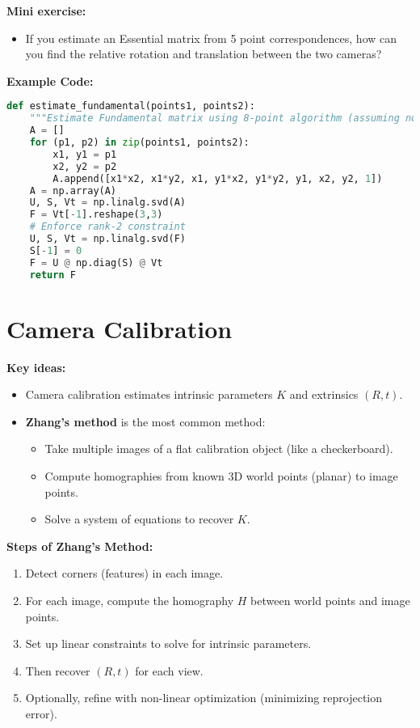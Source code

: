 \documentclass[a4paper,11pt]{article}
\begin{document}
\textbf{Mini exercise:}
\begin{itemize}
    \item If you estimate an Essential matrix from 5 point correspondences, how can you find the relative rotation and translation between the two cameras?
\end{itemize}

\vspace{1em}

\textbf{Example Code:}
\begin{lstlisting}[language=Python]
def estimate_fundamental(points1, points2):
    """Estimate Fundamental matrix using 8-point algorithm (assuming normalized points)."""
    A = []
    for (p1, p2) in zip(points1, points2):
        x1, y1 = p1
        x2, y2 = p2
        A.append([x1*x2, x1*y2, x1, y1*x2, y1*y2, y1, x2, y2, 1])
    A = np.array(A)
    U, S, Vt = np.linalg.svd(A)
    F = Vt[-1].reshape(3,3)
    # Enforce rank-2 constraint
    U, S, Vt = np.linalg.svd(F)
    S[-1] = 0
    F = U @ np.diag(S) @ Vt
    return F
\end{lstlisting}

\newpage
\section{Camera Calibration}

\textbf{Key ideas:}
\begin{itemize}
    \item Camera calibration estimates intrinsic parameters $K$ and extrinsics $(R, t)$.
    \item \textbf{Zhang’s method} is the most common method:
    \begin{itemize}
        \item Take multiple images of a flat calibration object (like a checkerboard).
        \item Compute homographies from known 3D world points (planar) to image points.
        \item Solve a system of equations to recover $K$.
    \end{itemize}
\end{itemize}

\textbf{Steps of Zhang's Method:}
\begin{enumerate}
    \item Detect corners (features) in each image.
    \item For each image, compute the homography $H$ between world points and image points.
    \item Set up linear constraints to solve for intrinsic parameters.
    \item Then recover $(R, t)$ for each view.
    \item Optionally, refine with non-linear optimization (minimizing reprojection error).
\end{enumerate}
\end{document}
